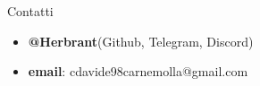 \begin{frame}{Contatti}
    \begin{itemize}
        \item \textbf{@Herbrant}(Github, Telegram, Discord)
        \item \textbf{email}: cdavide98carnemolla@gmail.com
    \end{itemize}
\end{frame}